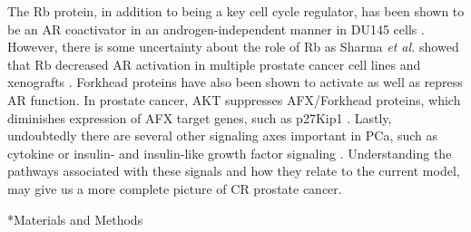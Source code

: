 \documentclass[12pt]{article}
\makeatletter
\renewcommand\section{\@startsection
	{subsection}{2}{0mm}
	{-0.2in}
	{0.05\baselineskip}
	{\normalfont\large\bfseries}}
\makeatother
\begin{document}
The Rb protein, in addition to being a key cell cycle regulator, has been shown to be an AR coactivator in an androgen-independent manner in DU145 cells \cite{Yeh1998}.
However, there is some uncertainty about the role of Rb as Sharma \textit{et al.} showed that Rb decreased AR activation in multiple prostate cancer cell lines and xenografts \cite{Sharma2010}. 
Forkhead proteins have also been shown to activate as well as repress AR function. 
In prostate cancer, AKT suppresses AFX/Forkhead proteins, which diminishes expression of AFX target genes, such as p27Kip1 \cite{Graff2000, Brunet1999, Medema2000, Takaishi1999}. 
Lastly, undoubtedly there are several other signaling axes important in PCa, such as cytokine or insulin- and insulin-like growth factor signaling \citep{Cardillo2003,Heinlein2004,Tam2007,Seaton2008}.
Understanding the pathways associated with these signals and how they relate to the current model, may give us a more complete picture of CR prostate cancer. 

                
\clearpage

\section*{Materials and Methods}
\end{document}
